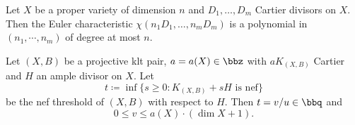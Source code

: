 
    \begin{lemma}\label{lem:Hilbert_polynomial}
        Let \(X\) be a proper variety of dimension \(n\) and \(D_1,\ldots,D_m\) Cartier divisors on \(X\).
        Then the Euler characteristic \(\chi(n_1D_1,\ldots,n_mD_m)\) is a polynomial in \((n_1,\cdots,n_m)\) of degree at most \(n\).
    \end{lemma}

    \begin{theorem}\label{thm: rationality theorem}
        Let \((X,B)\) be a projective klt pair, \(a = a(X) \in \bbz\) with \(aK_{(X,B)}\) Cartier and \(H\) an ample divisor on \(X\).
        Let 
        \[ t \coloneqq \inf \{s \geq 0: K_{(X,B)} + sH \text{ is nef}\} \]
        be the nef threshold of \((X,B)\) with respect to \(H\).
        Then \(t = v/u \in \bbq\) and 
        \[ 0 \leq v \leq a(X)\cdot (\dim X + 1). \]
    \end{theorem}

